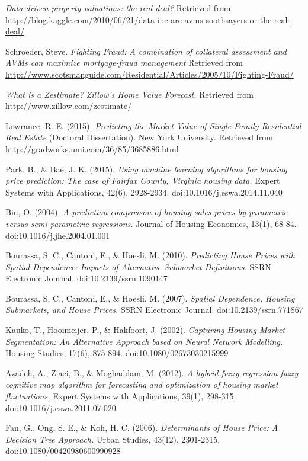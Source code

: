 \documentclass[10pt]{article}
\begin{document}
\begin{multicols}{2}
\begin{thebibliography}{13}
			\textit{Data-driven property valuations: the real deal?}
			Retrieved from \\ \small{\url{http://blog.kaggle.com/2010/06/21/data-inc-are-avms-soothsayers-or-the-real-deal/}}
			
			Schroeder, Steve.
			\textit{Fighting Fraud: A combination of collateral assessment and AVMs can maximize mortgage-fraud management}
			Retrieved from \\ \small{\url{http://www.scotsmanguide.com/Residential/Articles/2005/10/Fighting-Fraud/}}
			
			\textit{What is a Zestimate? Zillow's Home Value Forecast.}
			Retrieved from \\
			\small{\url{http://www.zillow.com/zestimate/}}
			
			Lowrance, R. E. (2015).
			\textit{Predicting the Market Value of Single-Family Residential Real Estate}
			(Doctoral Dissertation). New York University. Retrieved from \small{\url{http://gradworks.umi.com/36/85/3685886.html}}
			
			Park, B., \& Bae, J. K. (2015).
			\textit{Using machine learning algorithms for housing price prediction: The case of Fairfax County, Virginia housing data.}
			Expert Systems with Applications, 42(6), 2928-2934. doi:10.1016/j.eswa.2014.11.040
			
			Bin, O. (2004).
			\textit{A prediction comparison of housing sales prices by parametric versus semi-parametric regressions.}
			Journal of Housing Economics, 13(1), 68-84. doi:10.1016/j.jhe.2004.01.001
			
			Bourassa, S. C., Cantoni, E., \& Hoesli, M. (2010). 
			\textit{Predicting House Prices with Spatial Dependence: Impacts of Alternative Submarket Definitions.}
			SSRN Electronic Journal. doi:10.2139/ssrn.1090147
			
			Bourassa, S. C., Cantoni, E., \& Hoesli, M. (2007).
			\textit{Spatial Dependence, Housing Submarkets, and House Prices.}
			SSRN Electronic Journal. doi:10.2139/ssrn.771867
			
			Kauko, T., Hooimeijer, P., \& Hakfoort, J. (2002).
			\textit{Capturing Housing Market Segmentation: An Alternative Approach based on Neural Network Modelling.}
			Housing Studies, 17(6), 875-894. doi:10.1080/02673030215999
			
			Azadeh, A., Ziaei, B., \& Moghaddam, M. (2012).
			\textit{A hybrid fuzzy regression-fuzzy cognitive map algorithm for forecasting and optimization of housing market fluctuations.}
			Expert Systems with Applications, 39(1), 298-315. doi:10.1016/j.eswa.2011.07.020
			
			Fan, G., Ong, S. E., \& Koh, H. C. (2006).
			\textit{Determinants of House Price: A Decision Tree Approach.}
			Urban Studies, 43(12), 2301-2315. doi:10.1080/00420980600990928
		\end{thebibliography}
	\end{multicols}
\end{document}
